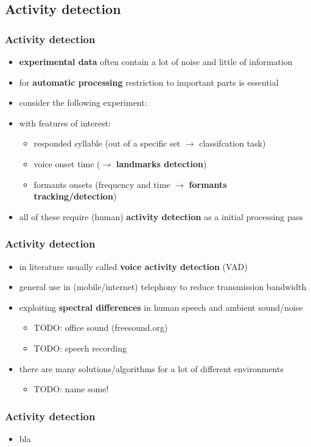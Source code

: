 
\subsection{Activity detection}

\begin{frame} %
	\frametitle{Activity detection}
	\begin{itemize}
		\item \textbf{experimental data} often contain a lot of noise and little of information
		\item for \textbf{automatic processing} restriction to important parts is essential
		\item consider the following experiment:
			\begin{figure}
				\centering
				\begin{subfigure}[c]{0.8\linewidth}
				\end{subfigure}
			\end{figure}
		\item with features of interest:
			\begin{itemize}
				\item responded syllable (out of a specific set $\rightarrow$ classifcation task)
				\item voice onset time ($\rightarrow$ \textbf{landmarks detection})
				\item formants onsets (frequency and time $\rightarrow$ \textbf{formants tracking/detection})
			\end{itemize}
		\item all of these require (human) \textbf{activity detection} as a initial processing pass
	\end{itemize}
\end{frame}

\begin{frame} %
	\frametitle{Activity detection}
	\begin{itemize}
		\item in literature usually called \textbf{voice activity detection} (VAD)
		\item general use in (mobile/internet) telephony to reduce transmission bandwidth
		\item exploiting \textbf{spectral differences} in human speech and ambient sound/noise
			\begin{itemize}
				\item TODO: office sound (freesound.org)
				\item TODO: speech recording
			\end{itemize}
		\item there are many solutions/algorithms for a lot of different environments
			\begin{itemize}
				\item TODO: name some!
			\end{itemize}
	\end{itemize}
\end{frame}

\begin{frame} %
	\frametitle{Activity detection}
	\begin{itemize}
		\item bla
	\end{itemize}
\end{frame}
